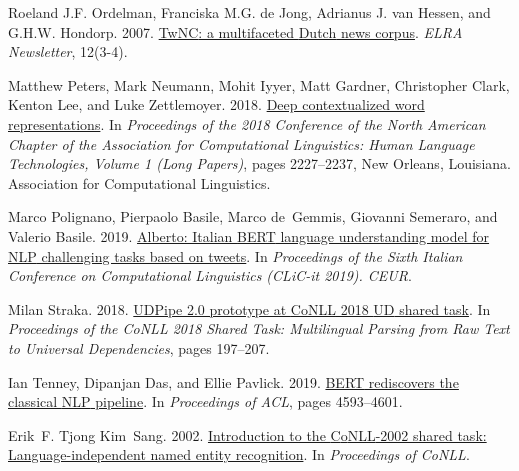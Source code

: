 \documentclass[11pt]{article}
\begin{document}
\begin{thebibliography}{21}
{Roeland J.F.} Ordelman, {Franciska M.G.} {de Jong}, {Adrianus J.} {van
  Hessen}, and G.H.W. Hondorp. 2007.
\newblock \href {https://core.ac.uk/download/pdf/11471744.pdf} {{TwNC}: a
  multifaceted {Dutch} news corpus}.
\newblock \emph{ELRA Newsletter}, 12(3-4).

Matthew Peters, Mark Neumann, Mohit Iyyer, Matt Gardner, Christopher Clark,
  Kenton Lee, and Luke Zettlemoyer. 2018.
\newblock \href {http://www.aclweb.org/anthology/N18-1202} {Deep contextualized
  word representations}.
\newblock In \emph{Proceedings of the 2018 Conference of the North American
  Chapter of the Association for Computational Linguistics: Human Language
  Technologies, Volume 1 (Long Papers)}, pages 2227--2237, New Orleans,
  Louisiana. Association for Computational Linguistics.

Marco Polignano, Pierpaolo Basile, Marco de~Gemmis, Giovanni Semeraro, and
  Valerio Basile. 2019.
\newblock \href {http://ceur-ws.org/Vol-2481/paper57.pdf} {Alberto: Italian
  {BERT} language understanding model for {NLP} challenging tasks based on
  tweets}.
\newblock In \emph{Proceedings of the Sixth Italian Conference on Computational
  Linguistics (CLiC-it 2019). CEUR}.

Milan Straka. 2018.
\newblock \href {https://doi.org/10.18653/v1/K18-2020} {{UDP}ipe 2.0 prototype
  at {C}o{NLL} 2018 {UD} shared task}.
\newblock In \emph{Proceedings of the {C}o{NLL} 2018 Shared Task: Multilingual
  Parsing from Raw Text to Universal Dependencies}, pages 197--207.

Ian Tenney, Dipanjan Das, and Ellie Pavlick. 2019.
\newblock \href {https://doi.org/10.18653/v1/P19-1452} {{BERT} rediscovers the
  classical {NLP} pipeline}.
\newblock In \emph{Proceedings of ACL}, pages 4593--4601.

Erik~F. Tjong Kim~Sang. 2002.
\newblock \href {https://www.aclweb.org/anthology/W02-2024} {Introduction to
  the {C}o{NLL}-2002 shared task: Language-independent named entity
  recognition}.
\newblock In \emph{Proceedings of {CoNLL}}.


\end{thebibliography}
\end{document}
